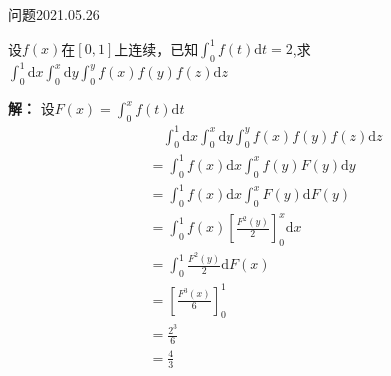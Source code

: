 \begin{mybox}{问题2021.05.26}
	
	\qquad 设$f(x)$在$[0,1]$上连续，已知$\int_{0}^{1} f(t)\mathrm{d}t=2$,求$\int_{0}^{1} \mathrm{d}x \int_{0}^{x} \mathrm{d}y \int_{0}^{y} f(x)f(y)f(z) \mathrm{d}z$
\end{mybox}
\noindent
\textbf{解：}
设$F(x)=\int_{0}^{x} f(t)\mathrm{d} t$
\begin{align*}
	&\quad \int_{0}^{1} \mathrm{d}x \int_{0}^{x} \mathrm{d}y \int_{0}^{y} f(x)f(y)f(z) \mathrm{d}z\\
	&=\int_{0}^{1}f(x)\mathrm{d}x\int_{0}^{x}f(y)F(y)\mathrm{d}y\\
	&=\int_{0}^{1}f(x)\mathrm{d}x\int_{0}^{x}F(y)\mathrm{d}F(y)\\
	&=\int_{0}^{1}f(x)[\frac{F^2 (y)}{2}]_{0}^{x}\mathrm{d}x\\
	&=\int_{0}^{1}\frac{F^2(y)}{2}\mathrm{d}F(x)\\
	&=[\frac{F^3(x)}{6}]_{0}^{1}\\
	&=\frac{2^3}{6}\\
	&=\frac{4}{3}
\end{align*}
